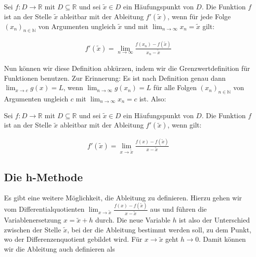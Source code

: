 \documentclass[fontsize=9pt,
               parskip=half-,
               DIV=14,
               listof=chapterentry,
               tocflat]{scrbook}
\begin{document}
\begin{importantparagraph*}
Sei $f:D\to \mathbb {R} $ mit $D\subseteq \mathbb {R} $ und sei ${\tilde {x}}\in D$ ein Häufungspunkt von $D$. Die Funktion $f$ ist an der Stelle ${\tilde {x}}$ ableitbar mit der Ableitung $f'({\tilde {x}})$, wenn für jede Folge $(x_{n})_{n\in \mathbb {N} }$ von Argumenten ungleich ${\tilde {x}}$ und mit $\lim _{n\to \infty }x_{n}={\tilde {x}}$ gilt:

\begin{align*}
f'({\tilde {x}})=\lim _{n\to \infty }{\frac {f(x_{n})-f({\tilde {x}})}{x_{n}-{\tilde {x}}}}
\end{align*}

\end{importantparagraph*}

Nun können wir diese Definition abkürzen, indem wir die Grenzwertdefinition für Funktionen benutzen. Zur Erinnerung: Es ist nach Definition genau dann $\lim _{x\to c}g(x)=L$, wenn $\lim _{n\to \infty }g(x_{n})=L$ für alle Folgen $(x_{n})_{n\in \mathbb {N} }$ von Argumenten ungleich $c$ mit $\lim _{n\to \infty }x_{n}=c$ ist. Also:

\begin{importantparagraph*}
Sei $f:D\to \mathbb {R} $ mit $D\subseteq \mathbb {R} $ und sei ${\tilde {x}}\in D$ ein Häufungspunkt von $D$. Die Funktion $f$ ist an der Stelle ${\tilde {x}}$ ableitbar mit der Ableitung $f'({\tilde {x}})$, wenn gilt:

\begin{align*}
f'({\tilde {x}})=\lim _{x\to {\tilde {x}}}{\frac {f(x)-f({\tilde {x}})}{x-{\tilde {x}}}}
\end{align*}

\end{importantparagraph*}

\subsection{Die h-Methode}

Es gibt eine weitere Möglichkeit, die Ableitung zu definieren. Hierzu gehen wir vom Differentialquotienten $\lim _{x\to {\tilde {x}}}{\tfrac {f(x)-f({\tilde {x}})}{x-{\tilde {x}}}}$ aus und führen die Variablenersetzung $x={\tilde {x}}+h$ durch. Die neue Variable $h$ ist also der Unterschied zwischen der Stelle ${\tilde {x}}$, bei der die Ableitung bestimmt werden soll, zu dem Punkt, wo der Differenzenquotient gebildet wird. Für $x\to {\tilde {x}}$ geht $h\to 0$. Damit können wir die Ableitung auch definieren als
\end{document}

